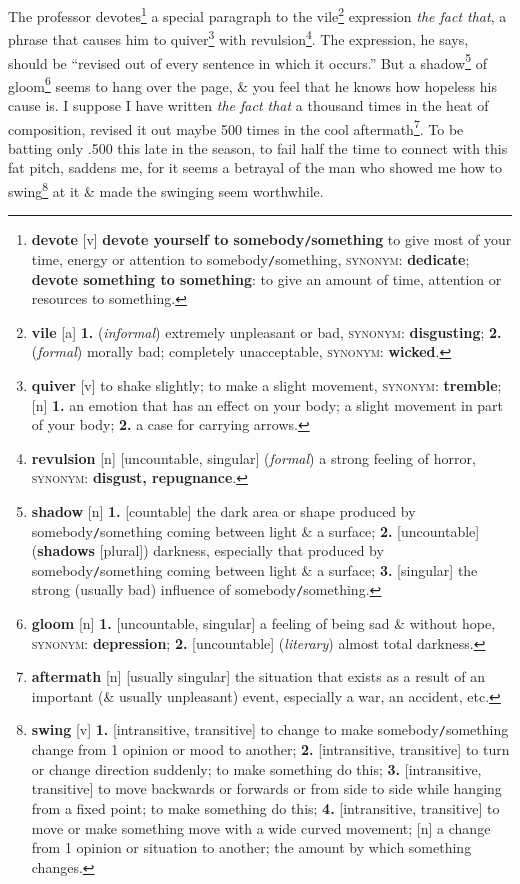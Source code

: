 \documentclass{article}
\begin{document}
The professor devotes\footnote{{\bf devote} [v] {\bf devote yourself to somebody{\tt/}something} to give most of your time, energy or attention to somebody{\tt/}something, \textsc{synonym}: {\bf dedicate}; {\bf devote something to something}: to give an amount of time, attention or resources to something.} a special paragraph to the vile\footnote{{\bf vile} [a] {\bf 1.} ({\it informal}) extremely unpleasant or bad, \textsc{synonym}: {\bf disgusting}; {\bf 2.} ({\it formal}) morally bad; completely unacceptable, \textsc{synonym}: {\bf wicked}.} expression {\it the fact that}, a phrase that causes him to quiver\footnote{{\bf quiver} [v] to shake slightly; to make a slight movement, \textsc{synonym}: {\bf tremble}; [n] {\bf 1.} an emotion that has an effect on your body; a slight movement in part of your body; {\bf 2.} a case for carrying arrows.} with revulsion\footnote{{\bf revulsion} [n] [uncountable, singular] ({\it formal}) a strong feeling of horror, \textsc{synonym}: {\bf disgust, repugnance}.}. The expression, he says, should be ``revised out of every sentence in which it occurs.'' But a shadow\footnote{{\bf shadow} [n] {\bf 1.} [countable] the dark area or shape produced by somebody{\tt/}something coming between light \& a surface; {\bf 2.} [uncountable] ({\bf shadows} [plural]) darkness, especially that produced by somebody{\tt/}something coming between light \& a surface; {\bf 3.} [singular] the strong (usually bad) influence of somebody{\tt/}something.} of gloom\footnote{{\bf gloom} [n] {\bf 1.} [uncountable, singular] a feeling of being sad \& without hope, \textsc{synonym}: {\bf depression}; {\bf 2.} [uncountable] ({\it literary}) almost total darkness.} seems to hang over the page, \& you feel that he knows how hopeless his cause is. I suppose I have written {\it the fact that} a thousand times in the heat of composition, revised it out maybe 500 times in the cool aftermath\footnote{{\bf aftermath} [n] [usually singular] the situation that exists as a result of an important (\& usually unpleasant) event, especially a war, an accident, etc.}. To be batting only .500 this late in the season, to fail half the time to connect with this fat pitch, saddens me, for it seems a betrayal of the man who showed me how to swing\footnote{{\bf swing} [v] {\bf 1.} [intransitive, transitive] to change to make somebody{\tt/}something change from 1 opinion or mood to another; {\bf 2.} [intransitive, transitive] to turn or change direction suddenly; to make something do this; {\bf 3.} [intransitive, transitive] to move backwards or forwards or from side to side while hanging from a fixed point; to make something do this; {\bf 4.} [intransitive, transitive] to move or make something move with a wide curved movement; [n] a change from 1 opinion or situation to another; the amount by which something changes.} at it \& made the swinging seem worthwhile.
\end{document}
